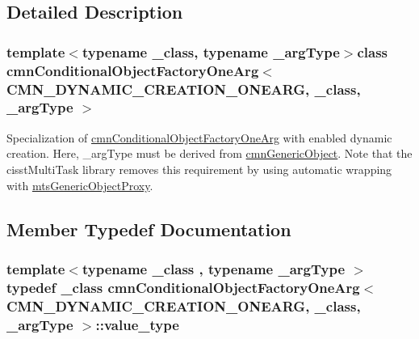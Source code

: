 \subsection{Detailed Description}
\subsubsection*{template$<$typename \+\_\+class, typename \+\_\+arg\+Type$>$class cmn\+Conditional\+Object\+Factory\+One\+Arg$<$ C\+M\+N\+\_\+\+D\+Y\+N\+A\+M\+I\+C\+\_\+\+C\+R\+E\+A\+T\+I\+O\+N\+\_\+\+O\+N\+E\+A\+R\+G, \+\_\+class, \+\_\+arg\+Type $>$}

Specialization of \hyperlink{classcmn_conditional_object_factory_one_arg}{cmn\+Conditional\+Object\+Factory\+One\+Arg} with enabled dynamic creation. Here, \+\_\+arg\+Type must be derived from \hyperlink{classcmn_generic_object}{cmn\+Generic\+Object}. Note that the cisst\+Multi\+Task library removes this requirement by using automatic wrapping with \hyperlink{classmts_generic_object_proxy}{mts\+Generic\+Object\+Proxy}. 

\subsection{Member Typedef Documentation}
\hypertarget{classcmn_conditional_object_factory_one_arg_3_01_c_m_n___d_y_n_a_m_i_c___c_r_e_a_t_i_o_n___o_n_ede9b022187ff72195baf5864ecd7352d_a33029699c2ed3d54426007bf39dd777c}{}
\subsubsection[{value\+\_\+type}]{\setlength{\rightskip}{0pt plus 5cm}template$<$typename \+\_\+class , typename \+\_\+arg\+Type $>$ typedef \+\_\+class {\bf cmn\+Conditional\+Object\+Factory\+One\+Arg}$<$ {\bf C\+M\+N\+\_\+\+D\+Y\+N\+A\+M\+I\+C\+\_\+\+C\+R\+E\+A\+T\+I\+O\+N\+\_\+\+O\+N\+E\+A\+R\+G}, \+\_\+class, \+\_\+arg\+Type $>$\+::{\bf value\+\_\+type}}\label{classcmn_conditional_object_factory_one_arg_3_01_c_m_n___d_y_n_a_m_i_c___c_r_e_a_t_i_o_n___o_n_ede9b022187ff72195baf5864ecd7352d_a33029699c2ed3d54426007bf39dd777c}


